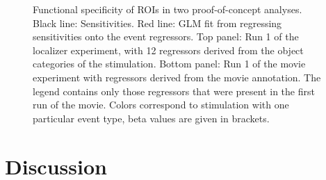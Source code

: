 \documentclass[a4paper, 12pt]{scrreprt}
\begin{document}
\begin{figure}[H]
	\caption[Functional specificity of ROIs in two proof-of-concept analyses.]{\small{Functional specificity of ROIs in two proof-of-concept analyses. Black line: Sensitivities. Red line: GLM fit from regressing sensitivities onto the event regressors. Top panel: Run 1 of the localizer experiment, with 12 regressors derived from the object categories of the stimulation. Bottom panel: Run 1 of the movie experiment with regressors derived from the movie annotation. The legend contains only those regressors that were present in the first run of the movie. Colors correspond to stimulation with one particular event type, beta values are given in brackets.}}
	\label{fig:locsens}
\end{figure}





\section{Discussion}\label{sec:c1_discussion}
\end{document}
